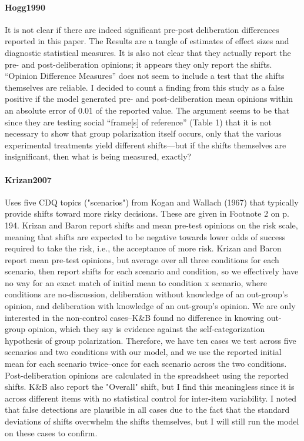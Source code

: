 \documentclass[12pt, letterpaper]{article}
\begin{document}
\paragraph{{Hogg1990}} It is not clear if there are indeed significant
pre-post deliberation differences reported in this paper. The Results are a
tangle of estimates of effect sizes and diagnostic statistical measures. It
is also not clear that they actually report the pre- and post-deliberation
opinions; it appears they only report the shifts. ``Opinion Difference
Measures'' does not seem to include a test that the shifts themselves are
reliable. I decided to count a finding from this study as a false positive if
the model generated pre- and post-deliberation mean opinions within an
absolute error of 0.01 of the reported value. The argument seems to be that
since they are testing social ``frame[s] of reference'' (Table 1) that it is
not necessary to show that group polarization itself occurs, only that the
various experimental treatments yield different shifts---but if the shifts
themselves are insignificant, then what is being measured, exactly?

\paragraph{{Krizan2007}} Uses five CDQ topics ("scenarios") from Kogan and
Wallach (1967) that typically provide shifts toward more risky decisions.  These are
given in Footnote 2 on p. 194. Krizan and Baron report shifts and mean pre-test
opinions on the risk scale, meaning that shifts are expected to be negative towards
lower odds of success required to take the risk, i.e., the acceptance of more risk.
Krizan and Baron report mean pre-test opinions, but average over all three conditions
for each scenario, then report shifts for each scenario and condition, so we
effectively have no way for an exact match of initial mean to condition x scenario,
where conditions are no-discussion, deliberation without knowledge of an out-group's
opinion, and deliberation with knowledge of an out-group's opinion. We are only
interested in the non-control cases--K\&B found no difference in knowing out-group
opinion, which they say is evidence against the self-categorization hypothesis of group
polarization.  Therefore, we have ten cases we test across five scenarios and two
conditions with our model, and we use the reported initial mean for each scenario
twice--once for each scenario across the two conditions. Post-deliberation opinions are
calculated in the spreadsheet using the reported shifts. K\&B also report the "Overall"
shift, but I find this meaningless since it is across different items with no
statistical control for inter-item variability. I noted that false detections are
plausible in all cases due to the fact that the standard deviations of shifts overwhelm
the shifts themselves, but I will still run the model on these cases to confirm.
\end{document}
